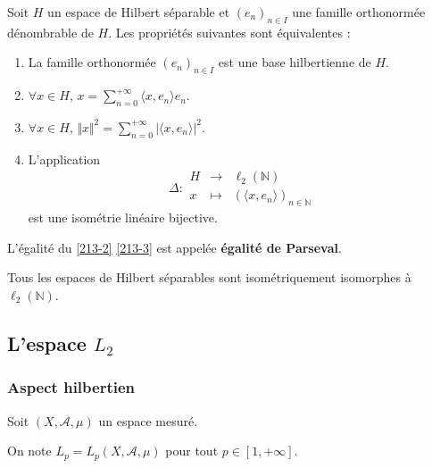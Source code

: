   \begin{theorem}
    \label{213-2}
    Soit $H$ un espace de Hilbert séparable et $(e_n)_{n \in I}$ une famille orthonormée dénombrable de $H$. Les propriétés suivantes sont équivalentes :
    \begin{enumerate}[label={\bfseries(\roman*)}]
      \item La famille orthonormée $(e_n)_{n \in I}$ est une base hilbertienne de $H$.
      \item $\forall x \in H, \, x = \sum_{n=0}^{+\infty} \langle x, e_n \rangle e_n$.
      \item \label{213-3} $\forall x \in H, \, \Vert x \Vert^2 = \sum_{n=0}^{+\infty} \vert \langle x, e_n \rangle \vert^2$.
      \item L'application
      \[
      \Delta :
      \begin{array}{ccc}
        H &\rightarrow& \ell_2(\mathbb{N}) \\
        x &\mapsto& (\langle x, e_n \rangle)_{n \in \mathbb{N}}
      \end{array}
      \]
      est une isométrie linéaire bijective.
    \end{enumerate}
  \end{theorem}

  \begin{remark}
    L'égalité du \cref{213-2} \cref{213-3} est appelée \textbf{égalité de Parseval}.
  \end{remark}


  \begin{corollary}
    Tous les espaces de Hilbert séparables sont isométriquement isomorphes à $\ell_2(\mathbb{N})$.
  \end{corollary}

  \subsection{L'espace \texorpdfstring{$L_2$}{L₂}}

  \subsubsection{Aspect hilbertien}


  Soit $(X, \mathcal{A}, \mu)$ un espace mesuré.

  \begin{notation}
    On note $L_p = L_p(X, \mathcal{A}, \mu)$ pour tout $p \in [1, +\infty]$.
  \end{notation}

